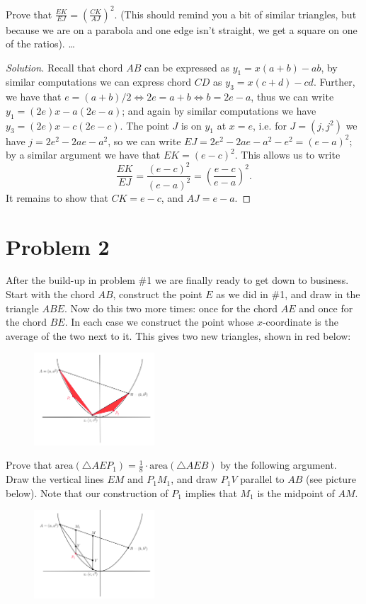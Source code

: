 \documentclass[letterpaper, 12pt]{amsart}
\theoremstyle{definition}  %
\begin{document}
		Prove that $\frac{EK}{EJ} = \left( \frac{CK}{AJ} \right)^{2}$.
		(This should remind you a bit of similar triangles, but because we are on a parabola and one edge isn't straight, we get a square on one of the ratios). \dots

		\begin{proof}[Solution]
		Recall that chord $AB$ can be expressed as $y_{1} = x(a+b) - ab$, by similar computations we can express chord $CD$ as $y_{3} = x(c+d) - cd$.
		Further, we have that $e = (a+b)/2 \iff 2e = a+b  \iff b = 2e - a$, thus we can write $y_{1} = (2e)x - a(2e - a)$; and again by similar computations we have $y_{3} = (2e)x - c(2e - c)$.
		The point $J$ is on $y_{1}$ at $x = e$, i.e. for $J = (j,j^{2})$ we have $j = 2e^{2} - 2ae - a^{2}$, so we can write $EJ = 2e^{2} - 2ae - a^{2} - e^{2} = (e-a)^{2}$; by a similar argument we have that $EK = (e-c)^{2}$.
		This allows us to write $$\frac{EK}{EJ} = \frac{(e-c)^{2}}{(e-a)^{2}} = \left( \frac{e-c}{e-a} \right)^{2}.$$
		It remains to show that $CK = e - c$, and $AJ = e - a$.
		\end{proof}

	\section*{Problem 2}
	After the build-up in problem \#1 we are finally ready to get down to business. 
	Start with the chord $AB$, construct the point $E$ as we did in \#1, and draw in the triangle $ABE$. 
	Now do this two more times: once for the chord $AE$ and once for the chord $BE$. 
	In each case we construct the point whose $x$-coordinate is the average of the two next to it. 
	This gives two new triangles, shown in red below:
	\begin{figure}[h]
	\includegraphics[width=0.4\textwidth]{figures/5.png}
	\end{figure}

	Prove that $\text{area}(\triangle AEP_{1}) = \frac{1}{8} \cdot \text{area}(\triangle AEB)$ by the following argument. 
	Draw the vertical lines $EM$ and $P_{1}M_{1}$, and draw $P_{1}V$ parallel to $AB$ (see picture below). 
	Note that our construction of $P_{1}$ implies that $M_{1}$ is the midpoint of $AM$.
	\begin{figure}[h]
	\includegraphics[width=0.4\textwidth]{figures/6.png}
	\end{figure}
\end{document}
